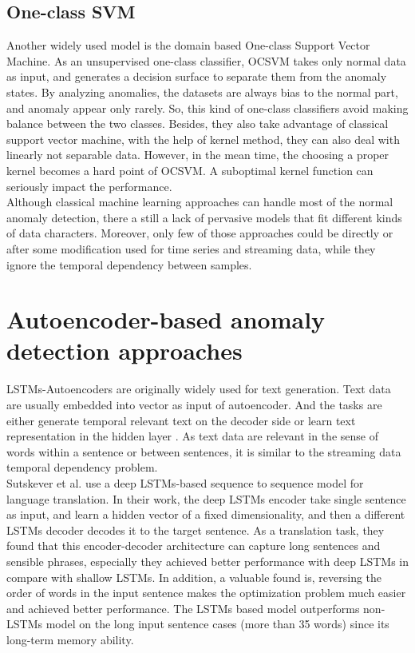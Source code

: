 \subsection{One-class SVM}
\label{ocsvm}
Another widely used model is the domain based One-class Support Vector Machine. As an unsupervised one-class classifier, OCSVM takes only normal data as input, and generates a decision surface to separate them from the anomaly states. By analyzing anomalies, the datasets are always bias to the normal part, and anomaly appear only rarely. So, this kind of one-class classifiers avoid making balance between the two classes. Besides, they also take advantage of classical support vector machine, with the help of kernel method, they can also deal with linearly not separable data. However, in the mean time, the choosing a proper kernel becomes a hard point of OCSVM. A suboptimal kernel function can seriously impact the performance.\\
Although classical machine learning approaches can handle most of the normal anomaly detection, there a still a lack of pervasive models that fit different kinds of data characters. Moreover, only few of those approaches could be directly or after some modification used for time series and streaming data, while they ignore the temporal dependency between samples.




\section{Autoencoder-based anomaly detection approaches}
\label{sec:Autoencoder-based anomaly detection approaches}

LSTMs-Autoencoders are originally widely used for text generation. Text data are usually embedded into vector as input of autoencoder. And the tasks are either generate temporal relevant text on the decoder side or learn text representation in the hidden layer \cite{phraserepresentation}. As text data are relevant in the sense of words within a sentence or between sentences, it is similar to the streaming data temporal dependency problem.\\

Sutskever et al. \cite{seq2seq} use a deep LSTMs-based sequence to sequence model for language translation. In their work, the deep LSTMs encoder take single sentence as input, and learn a hidden vector of a fixed dimensionality, and then a different LSTMs decoder decodes it to the target sentence.  As a translation task, they found that this encoder-decoder architecture can capture long sentences and sensible phrases, especially they achieved better performance with deep LSTMs in compare with shallow LSTMs. In addition, a valuable found is, reversing the order of words in the input sentence makes the optimization problem much easier and achieved better performance. The LSTMs based model outperforms non-LSTMs model on the long input sentence cases (more than 35 words) since its long-term memory ability.\\

